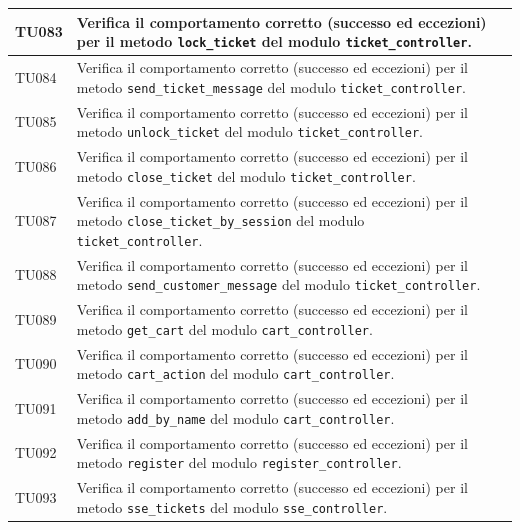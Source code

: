 \documentclass[a4paper,11pt,oneside]{scrartcl}
\begin{document}
\begin{longtable}{|p{1.9cm}|p{11.6cm}|c|}
    TU083           & Verifica il comportamento corretto (successo ed eccezioni) per il metodo \texttt{lock\_ticket} del modulo \texttt{ticket\_controller}.                       &                \\ \hline
    TU084           & Verifica il comportamento corretto (successo ed eccezioni) per il metodo \texttt{send\_ticket\_message} del modulo \texttt{ticket\_controller}.              &                \\ \hline
    TU085           & Verifica il comportamento corretto (successo ed eccezioni) per il metodo \texttt{unlock\_ticket} del modulo \texttt{ticket\_controller}.                     &                \\ \hline
    TU086           & Verifica il comportamento corretto (successo ed eccezioni) per il metodo \texttt{close\_ticket} del modulo \texttt{ticket\_controller}.                      &                \\ \hline
    TU087           & Verifica il comportamento corretto (successo ed eccezioni) per il metodo \texttt{close\_ticket\_by\_session} del modulo \texttt{ticket\_controller}.         &                \\ \hline
    TU088           & Verifica il comportamento corretto (successo ed eccezioni) per il metodo \texttt{send\_customer\_message} del modulo \texttt{ticket\_controller}.            &                \\ \hline
    TU089           & Verifica il comportamento corretto (successo ed eccezioni) per il metodo \texttt{get\_cart} del modulo \texttt{cart\_controller}.                            &                \\ \hline
    TU090           & Verifica il comportamento corretto (successo ed eccezioni) per il metodo \texttt{cart\_action} del modulo \texttt{cart\_controller}.                         &                \\ \hline
    TU091           & Verifica il comportamento corretto (successo ed eccezioni) per il metodo \texttt{add\_by\_name} del modulo \texttt{cart\_controller}.                        &                \\ \hline
    TU092           & Verifica il comportamento corretto (successo ed eccezioni) per il metodo \texttt{register} del modulo \texttt{register\_controller}.                         &                \\ \hline
    TU093           & Verifica il comportamento corretto (successo ed eccezioni) per il metodo \texttt{sse\_tickets} del modulo \texttt{sse\_controller}.                          &                \\ \hline

\end{longtable}
\end{document}
